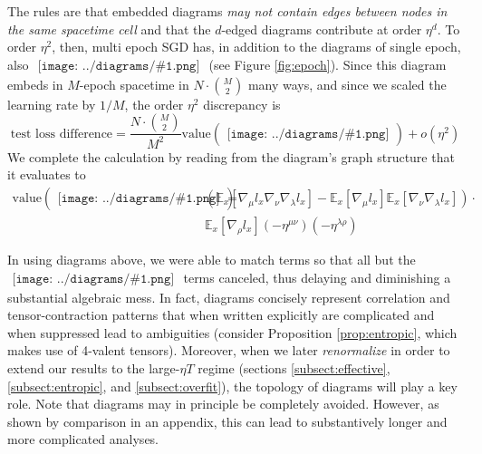 \documentclass{article}
\newcommand{\expc}{\mathbb{E}}
\newcommand{\wrap}[1]{\left(#1\right)}
\newcommand{\wasq}[1]{\left[#1\right]}
\newcommand{\sdia}[1]{\begin{gathered}\texttt{[image: ../diagrams/\#1.png]}\end{gathered}}
\begin{document}
        The rules are that embedded diagrams \emph{may not contain edges between
        nodes in the same spacetime cell} and that the $d$-edged diagrams
        contribute at order $\eta^d$.
        To order $\eta^2$, then, multi epoch SGD has, in addition to the
        diagrams of single epoch, also 
        $\sdia{c(01-2)(01-12)}$
        (see Figure \ref{fig:epoch}).
        Since this diagram embeds in $M$-epoch spacetime in
        $N\cdot{M\choose 2}$ many ways, and since we scaled the learning rate
        by $1/M$, the order $\eta^2$ discrepancy is
        $$
            \text{test loss difference} =  
            \frac{N\cdot {M\choose 2}}{M^2}
            \text{value}\wrap{\sdia{c(01-2)(01-12)}}
            + o(\eta^2)
        $$
        We complete the calculation by reading from the diagram's graph
        structure that it evaluates to
        \begin{align*}
            \text{value}\wrap{\sdia{c(01-2)(01-12)}}
            =
            &\wrap{
                \expc_{x}\wasq{\nabla_\mu l_x \nabla_\nu \nabla_\lambda l_x} 
                -
                \expc_{x}\wasq{\nabla_\mu l_x} \expc_{x}\wasq{\nabla_\nu \nabla_\lambda l_x} 
            } \cdot \\
            &\expc_{x}\wasq{\nabla_\rho l_x}
            \wrap{-\eta^{\mu\nu}} \wrap{-\eta^{\lambda\rho}}
        \end{align*}

        In using diagrams above, we were able to match terms so that all but
        the $\sdia{c(01-2)(01-12)}$ terms canceled, thus delaying and
        diminishing a substantial algebraic mess.  In fact, diagrams  
        concisely represent correlation and tensor-contraction patterns that
        when written explicitly are complicated and when suppressed lead to
        ambiguities (consider Proposition \ref{prop:entropic}, which makes
        use of 4-valent tensors).  Moreover, when we later \emph{renormalize}
        in order to extend our results to the large-$\eta T$ regime (sections
        \ref{subsect:effective}, \ref{subsect:entropic}, and
        \ref{subsect:overfit}), the topology of diagrams will play a key role.  
        Note that diagrams may in principle be completely avoided.  However, as
        shown by comparison in an appendix, this can lead to substantively
        longer and more complicated analyses.   

\end{document}
